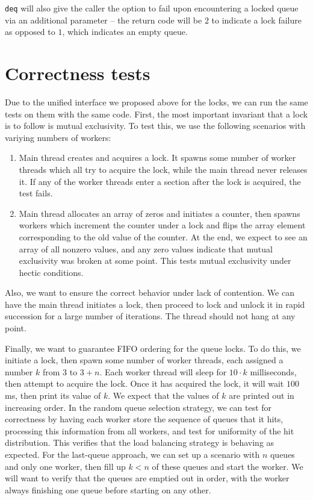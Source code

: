 \documentclass{article}
\begin{document}
\verb|deq| will also give the caller the option to fail upon encountering a locked queue via an additional parameter -- the return code will be $2$ to indicate a lock failure as opposed to $1$, which indicates an empty queue.
\section*{Correctness tests}
Due to the unified interface we proposed above for the locks, we can run the same tests on them with the same code. First, the most important invariant that a lock is to follow is mutual exclusivity. To test this, we use the following scenarios with variying numbers of workers:
\begin{enumerate}
    \item Main thread creates and acquires a lock. It spawns some number of worker threads which all try to acquire the lock, while the main thread never releases it. If any of the worker threads enter a section after the lock is acquired, the test fails.
    \item Main thread allocates an array of zeros and initiates a counter, then spawns workers which increment the counter under a lock and flips the array element corresponding to the old value of the counter. At the end, we expect to see an array of all nonzero values, and any zero values indicate that mutual exclusivity was broken at some point. This tests mutual exclusivity under hectic conditions.
\end{enumerate}
Also, we want to ensure the correct behavior under lack of contention. We can have the main thread initiates a lock, then proceed to lock and unlock it in rapid succession for a large number of iterations. The thread should not hang at any point. 

Finally, we want to guarantee FIFO ordering for the queue locks. To do this, we initiate a lock, then spawn some number of worker threads, each assigned a number $k$ from $3$ to $3+n$. Each worker thread will sleep for $10\cdot k$ milliseconds, then attempt to acquire the lock. Once it has acquired the lock, it will wait $100$ms, then print its value of $k$. We expect that the values of $k$ are printed out in increasing order. 
In the random queue selection strategy, we can test for correctness by having each worker store the sequence of queues that it hits, processing this information from all workers, and test for uniformity of the hit distribution. This verifies that the load balancing strategy is behaving as expected. For the last-queue approach, we can set up a scenario with $n$ queues and only one worker, then fill up $k<n$ of these queues and start the worker. We will want to verify that the queues are emptied out in order, with the worker always finishing one queue before starting on any other.
\end{document}
